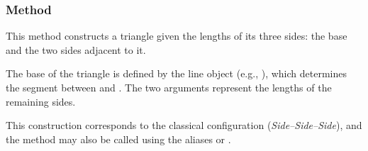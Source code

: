 \begin{minipage}{.35\textwidth}
\begin{center}
\end{center}
\end{minipage}
\begin{minipage}{.65\textwidth}
\begin{tkzexample}
\end{tkzexample}
\end{minipage}

\subsubsection{Method }
\label{ssub:triangle_with_three_given_sides}

This method constructs a triangle given the lengths of its three sides: the base and the two sides adjacent to it.

\medskip

The base of the triangle is defined by the line object (e.g., ), which determines the segment between  and . The two arguments  represent the lengths of the remaining sides.

\medskip

This construction corresponds to the classical  configuration (\textit{Side–Side–Side}), and the method may also be called using the aliases  or .

\vspace{1em}

